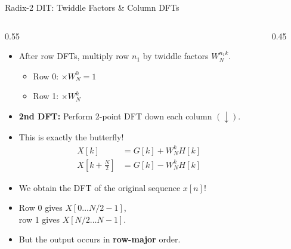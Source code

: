 \begin{frame}{Radix-2 DIT: Twiddle Factors \& Column DFTs}
    \begin{columns}
        \begin{column}{0.55\textwidth}
            \begin{itemize}
                \item After row DFTs, multiply row $n_1$ by twiddle factors $W_N^{n_1 k}$.
                      \begin{itemize}
                          \item Row 0: $\times W_N^0 = 1$
                          \item Row 1: $\times W_N^{k}$
                      \end{itemize}
                \item \textbf{2nd DFT:} Perform 2-point DFT down each column $(\downarrow)$.
                \item This is exactly the butterfly!
                      \begin{align*}
                          X[k]                  & = G[k] + W_N^{k} H[k] \\
                          X[k\!+\!\tfrac{N}{2}] & = G[k] - W_N^{k} H[k]
                      \end{align*}
                \item We obtain the DFT of the original sequence $x[n]$!
                \item Row 0 gives $X[0 \dots N/2\!-\!1]$, \\
                      row 1 gives $X[N/2 \dots N\!-\!1]$.
                \item But the output occurs in \textbf{row-major} order.
            \end{itemize}
        \end{column}
        \begin{column}{0.45\textwidth}
            \centering
            \vspace{0.1cm}
\end{column}
\end{columns}
\end{frame}
